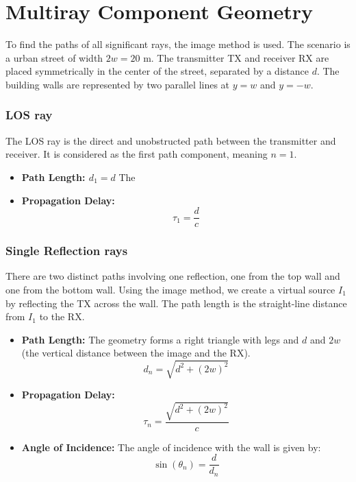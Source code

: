 \section{Multiray Component Geometry}
To find the paths of all significant rays, the image method is used. The scenario is a urban street of width $2w = 20$ m. The transmitter TX and receiver RX are placed symmetrically in the center of the street, separated by a distance $d$. The building walls are represented by two parallel lines at $y = w$ and $y = -w$.

\subsubsection{LOS ray}
The LOS ray is the direct and unobstructed path between the transmitter and receiver. It is considered as the first path component, meaning $n=1$.
\begin{itemize}
	\item \textbf{Path Length: $d_1 = d$} The
	\item \textbf{Propagation Delay:}
	\begin{equation}
		\tau_{1} = \frac{d}{c}
	\end{equation}
\end{itemize}

\subsubsection{Single Reflection rays}
There are two distinct paths involving one reflection, one from the top wall and one from the bottom wall. Using the image method, we create a virtual source $I_1$ by reflecting the TX across the wall. The path length is the straight-line distance from $I_1$ to the RX.
\begin{itemize}
	\item \textbf{Path Length:} The geometry forms a right triangle with legs and $d$ and $2w$ (the vertical distance between the image and the RX).
	\begin{equation}
		d_{n} = \sqrt{d^2 + (2w)^2}
	\end{equation}
	\item \textbf{Propagation Delay:}
	\begin{equation}
		\tau_{n} = \frac{\sqrt{d^2 + (2w)^2}}{c}
	\end{equation}
	\item \textbf{Angle of Incidence:} The angle of incidence with the wall is given by:
	\begin{equation}
		\sin(\theta_{n}) = \frac{d}{d_{n}}
	\end{equation}
\end{itemize}

